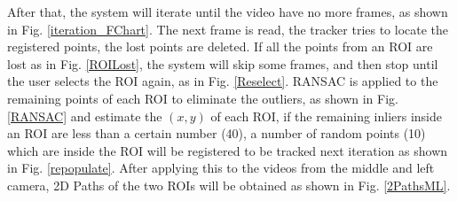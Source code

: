 \documentclass[journal]{IEEEtran}
\begin{document}
After that, the system will iterate until the video have no more frames, as shown in Fig. \ref{iteration_FChart}. The next frame is read, the tracker tries to locate the registered points, the lost points are deleted. If all the points from an ROI are lost as in Fig. \ref{ROILost}, the system will skip some frames, and then stop until the user selects the ROI again, as in Fig. \ref{Reselect}. RANSAC is applied to the remaining points of each ROI to eliminate the outliers, as shown in Fig. \ref{RANSAC} and estimate the $(x,y)$ of each ROI, if the remaining inliers inside an ROI are less than a certain number (40), a number of random points (10) which are inside the ROI will be registered to be tracked next iteration as shown in Fig. \ref{repopulate}.
After applying this to the videos from the middle and left camera, 2D Paths of the two ROIs will be obtained as shown in Fig. \ref{2PathsML}.
\end{document}
